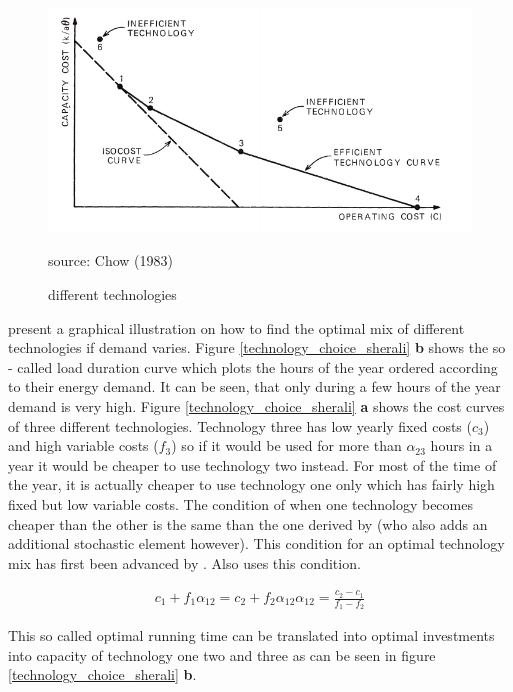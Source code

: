 \begin{figure}[h]
\centering
\includegraphics[width=.5\textwidth]{capacity/technology_choice_chow}
      \label{technology_choice_chow}            
      \caption{different technologies}
       source: Chow (1983)
\end{figure}

\cite{sherali1982} present a graphical illustration on how to find the optimal mix of different technologies if demand varies. Figure \ref{technology_choice_sherali} \textbf{b} shows the so - called load duration curve which plots the hours of the year ordered according to their energy demand. It can be seen, that only during a few hours of the year demand is very high. Figure \ref{technology_choice_sherali} \textbf{a} shows the cost curves of three different technologies. Technology three has low yearly fixed costs ($c_3$) and high variable costs ($f_3$) so if it would be used for more than $\alpha_{23}$ hours in a year it would be cheaper to use technology two instead. For most of the time of the year, it is actually cheaper to use technology one only which has fairly high fixed but low variable costs. The condition of when one technology becomes cheaper than the other is the same than the one derived by \cite{chow1983} (who also adds an additional stochastic element however). This condition for an optimal technology mix has first been advanced by \cite{Turvey1968}. Also \cite{Pineau2007} uses this condition.

\begin{eqnarray}
	c_1 + f_1 \alpha_{12} = c_2 + f_2 \alpha_{12}
	\alpha_{12} = \frac{c_2-c_1}{f_1-f_2}
\end{eqnarray}

This so called optimal running time can be translated into optimal investments into capacity of technology one two and three as can be seen in figure \ref{technology_choice_sherali} \textbf{b}.

